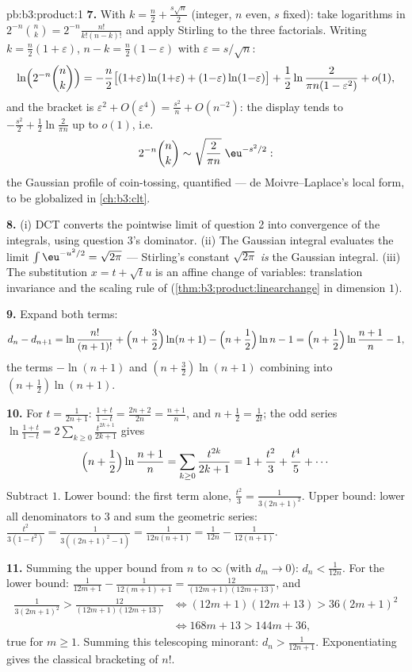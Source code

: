 \begin{solution}{pb:b3:product:1}
\textbf{7.} With $k = \frac n2 + \frac{s\sqrt n}2$ (integer,
$n$ even, $s$ fixed): take logarithms in $2^{-n}\binom nk =
2^{-n}\frac{n!}{k!(n-k)!}$ and apply Stirling to the three
factorials. Writing $k = \frac n2(1 + \varepsilon)$, $n - k =
\frac n2(1 - \varepsilon)$ with $\varepsilon = s/\sqrt n$:
\[
\ln\Bigl(2^{-n}\binom nk\Bigr)
= -\frac n2\bigl[(1{+}\varepsilon)\ln(1{+}\varepsilon) +
(1{-}\varepsilon)\ln(1{-}\varepsilon)\bigr]
+ \frac12\ln\frac{2}{\pi n(1 - \varepsilon^2)} + o(1),
\]
and the bracket is $\varepsilon^2 + O(\varepsilon^4) =
\frac{s^2}n + O(n^{-2})$: the display tends to $-\frac{s^2}2 +
\frac12\ln\frac2{\pi n}$ up to $o(1)$, i.e.
\[
2^{-n}\binom nk \sim \sqrt{\frac{2}{\pi
n}}\;\eu^{-s^2/2} :
\]
the Gaussian profile of coin-tossing, quantified ---
de Moivre--Laplace's local form, to be globalized in
\cref{ch:b3:clt}.

\textbf{8.} (i) DCT converts the pointwise limit of question 2
into convergence of the integrals, using question 3's
dominator. (ii) The Gaussian integral evaluates the limit
$\int\eu^{-u^2/2} = \sqrt{2\pi}$ --- Stirling's constant
$\sqrt{2\pi}$ \emph{is} the Gaussian integral. (iii) The
substitution $x = t + \sqrt tu$ is an affine change of
variables: translation invariance and the scaling rule of
 (\cref{thm:b3:product:linearchange} in
dimension $1$).

\textbf{9.} Expand both terms:
\[
d_n - d_{n+1} = \ln\frac{n!}{(n+1)!} + \Bigl(n +
\frac32\Bigr)\ln(n+1) - \Bigl(n + \frac12\Bigr)\ln n - 1
= \Bigl(n + \frac12\Bigr)\ln\frac{n+1}n - 1,
\]
the terms $-\ln(n+1)$ and $(n + \frac32)\ln(n+1)$ combining
into $(n + \frac12)\ln(n+1)$.

\textbf{10.} For $t = \frac1{2n+1}$: $\frac{1+t}{1-t} =
\frac{2n+2}{2n} = \frac{n+1}n$, and $n + \frac12 =
\frac1{2t}$; the odd series $\ln\frac{1+t}{1-t} =
2\sum_{k\geq0}\frac{t^{2k+1}}{2k+1}$ gives
\[
\Bigl(n + \frac12\Bigr)\ln\frac{n+1}n
= \sum_{k\geq0}\frac{t^{2k}}{2k+1}
= 1 + \frac{t^2}3 + \frac{t^4}5 + \cdots
\]
Subtract $1$. Lower bound: the first term alone,
$\frac{t^2}3 = \frac1{3(2n+1)^2}$. Upper bound: lower all
denominators to $3$ and sum the geometric series:
$\frac{t^2}{3(1 - t^2)} = \frac1{3((2n+1)^2 - 1)} =
\frac1{12n(n+1)} = \frac1{12n} - \frac1{12(n+1)}$.

\textbf{11.} Summing the upper bound from $n$ to $\infty$
(with $d_m \to 0$): $d_n < \frac1{12n}$. For the lower bound:
$\frac1{12m+1} - \frac1{12(m+1)+1} =
\frac{12}{(12m+1)(12m+13)}$, and
\begin{align*}
\frac1{3(2m+1)^2} > \frac{12}{(12m+1)(12m+13)}
&\iff (12m+1)(12m+13) > 36(2m+1)^2 \\
&\iff 168m + 13 > 144m + 36,
\end{align*}
true for $m \geq 1$. Summing this telescoping minorant:
$d_n > \frac1{12n+1}$. Exponentiating gives the classical
bracketing of $n!$.


\end{solution}
